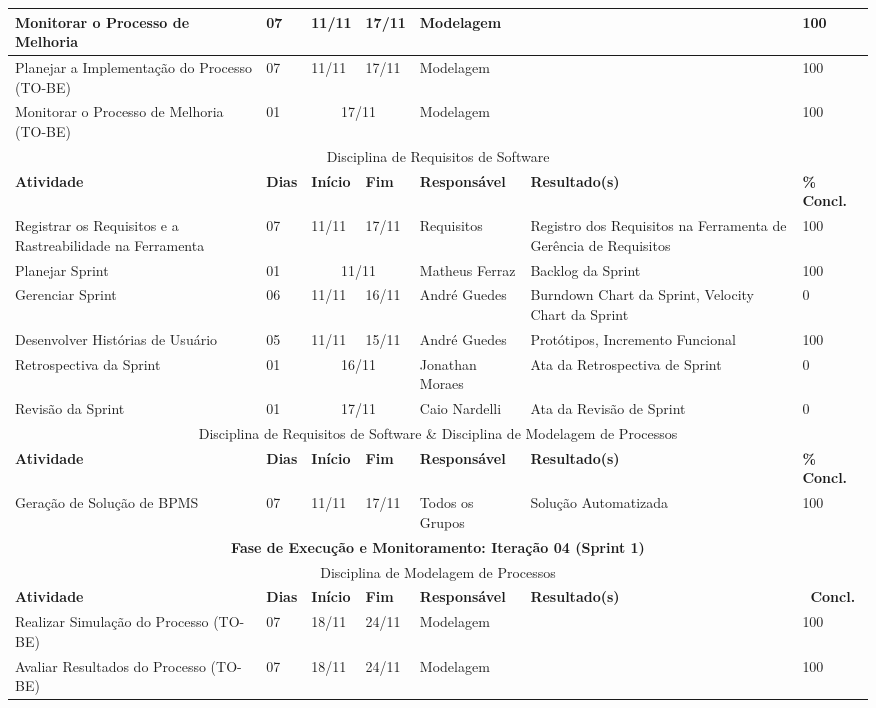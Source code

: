 \begin{center}
	\begin{tabular}{|m{6cm}|m{1cm}|m{1cm}|m{1cm}|m{4cm}|m{6cm}|m{2cm}|}
	\hline
	Monitorar o Processo de Melhoria & 07 & 11/11 & 17/11 & Modelagem & & 100 \\ \hline
	Planejar a Implementação do Processo (TO-BE) & 07 & 11/11 & 17/11 & Modelagem & & 100 \\ \hline
	Monitorar o Processo de Melhoria (TO-BE) & 01 & \multicolumn{2}{c|}{17/11} & Modelagem & & 100 \\ \hline
	\multicolumn{7}{|c|}{Disciplina de Requisitos de Software} \\
	\hline
	\textbf{Atividade} & \textbf{Dias} & \textbf{Início} & \textbf{Fim} & \textbf{Responsável} & \textbf{Resultado(s)} & \textbf{\% Concl.} \\ \hline
	Registrar os Requisitos e a Rastreabilidade na Ferramenta & 07 & 11/11 & 17/11 & Requisitos & Registro dos Requisitos na Ferramenta de Gerência de Requisitos & 100 \\ \hline
	Planejar Sprint & 01 & \multicolumn{2}{c|}{11/11} & Matheus Ferraz & Backlog da Sprint & 100 \\ \hline
	Gerenciar Sprint & 06 & 11/11 & 16/11 & André Guedes & Burndown Chart da Sprint, Velocity Chart da Sprint & 0 \\ \hline
	Desenvolver Histórias de Usuário & 05 & 11/11 & 15/11 & André Guedes & Protótipos, Incremento Funcional & 100 \\ \hline
	Retrospectiva da Sprint & 01 & \multicolumn{2}{c|}{16/11} & Jonathan Moraes & Ata da Retrospectiva de Sprint & 0 \\ \hline
	Revisão da Sprint & 01 & \multicolumn{2}{c|}{17/11} & Caio Nardelli & Ata da Revisão de Sprint & 0 \\ \hline
	\multicolumn{7}{|c|}{Disciplina de Requisitos de Software \& Disciplina de Modelagem de Processos} \\ \hline
	\textbf{Atividade} & \textbf{Dias} & \textbf{Início} & \textbf{Fim} & \textbf{Responsável} & \textbf{Resultado(s)} & \textbf{\% Concl.} \\ \hline
	Geração de Solução de BPMS & 07 & 11/11 & 17/11 & Todos os Grupos & Solução Automatizada & 100 \\ \hline
	\multicolumn{7}{|c|}{\textbf{Fase de Execução e Monitoramento: Iteração 04 (Sprint 1)}} \\
	\hline
	\multicolumn{7}{|c|}{Disciplina de Modelagem de Processos} \\
	\hline
	\textbf{Atividade} & \textbf{Dias} & \textbf{Início} & \textbf{Fim} & \textbf{Responsável} & \textbf{Resultado(s)} & \textbf{\ Concl.} \\ \hline
	Realizar Simulação do Processo (TO-BE) & 07 & 18/11 & 24/11 & Modelagem & & 100 \\ \hline
	Avaliar Resultados do Processo (TO-BE) & 07 & 18/11 & 24/11 & Modelagem & & 100 \\ \hline
	\end{tabular}
\end{center}
